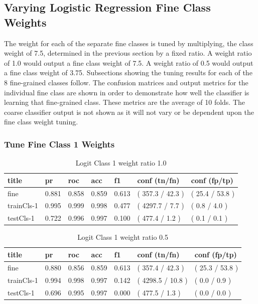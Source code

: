\documentclass[ms]{nuthesis}
\begin{document}
\subsection{Varying Logistic Regression Fine Class Weights}
\par The weight for each of the separate fine classes is tuned by multiplying,
the class weight of 7.5, determined in the previous section by a fixed ratio. A
weight ratio of 1.0 would output a fine class weight of 7.5. A weight ratio of
 0.5 would output a fine class weight of 3.75. Subsections showing the tuning results
 for each of the 8 fine-grained classes follow. The confusion matrices and output metrics for the individual
 fine class are shown in order to demonstrate how well the classifier is learning that
 fine-grained class. These metrics are the average of 10 folds. The coarse classifier output
 is not shown as it will not vary or be dependent upon the fine class weight tuning.

\subsubsection{Tune Fine Class 1 Weights}
\FloatBarrier
\begin{table}[H]
\centering
\caption{Logit Class 1 weight ratio 1.0}
\label{tab:LogRegCls1-Wt1}
\begin{tabular}{|l||l||l||l||l||l||l|}\toprule
title & pr & roc & acc & f1 & conf (tn/fn) & conf (fp/tp) \\ \midrule
fine & 0.881 & 0.858 & 0.859 & 0.613 & ( 357.3 / 42.3 ) & ( 25.4 / 53.8 ) \\
trainCls-1 & 0.995 & 0.999 & 0.998 & 0.477 & ( 4297.7 / 7.7 ) & ( 0.8 / 4.0 ) \\
testCls-1 & 0.722 & 0.996 & 0.997 & 0.100 & ( 477.4 / 1.2 ) & ( 0.1 / 0.1 ) \\ \bottomrule
\end{tabular}
\end{table}
\FloatBarrier


\FloatBarrier
\begin{table}[H]
\centering
\caption{Logit Class 1 weight ratio 0.5}
\label{tab:LogRegCls1-Wtp5}
\begin{tabular}{|l||l||l||l||l||l||l|}\toprule
title & pr & roc & acc & f1 & conf (tn/fn) & conf (fp/tp) \\ \midrule
fine & 0.880 & 0.856 & 0.859 & 0.613 & ( 357.4 / 42.3 ) & ( 25.3 / 53.8 ) \\
trainCls-1 & 0.994 & 0.998 & 0.997 & 0.142 & ( 4298.5 / 10.8 ) & ( 0.0 / 0.9 ) \\
testCls-1 & 0.696 & 0.995 & 0.997 & 0.000 & ( 477.5 / 1.3 ) & ( 0.0 / 0.0 ) \\ \bottomrule
\end{tabular}
\end{table}
\FloatBarrier
\end{document}
